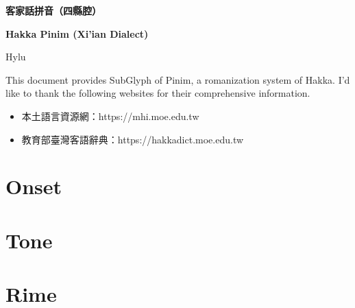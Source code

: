 \documentclass[12pt]{article}
\begin{document}

\begin{center}
    {\Huge \textbf{客家話拼音（四縣腔）} \par}
    {\Huge \textbf{Hakka Pinim (Xi'ian Dialect)} \par}
    {\Large Hylu \par}
    \hrulefill
\end{center}
This document provides SubGlyph of Pinim, a romanization system of Hakka. I'd like to thank the following websites for their comprehensive information. \par
\begin{itemize}
	\item 本土語言資源網：https://mhi.moe.edu.tw
	\item 教育部臺灣客語辭典：https://hakkadict.moe.edu.tw
\end{itemize}

\section{Onset}
%

\section{Tone}
%
\clearpage

\section{Rime}
%
\end{document}
